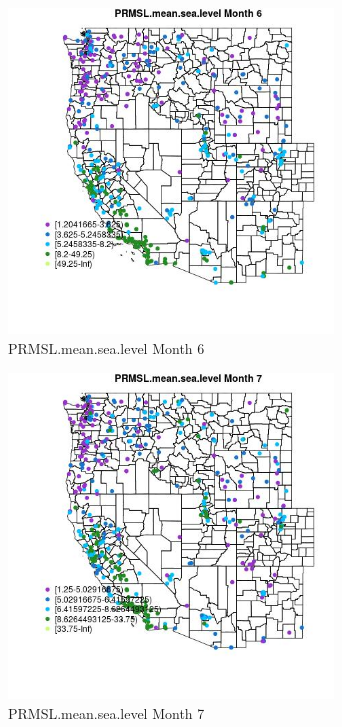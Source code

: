 \begin{figure} 
\centering  
\includegraphics[width=0.77\textwidth]{Code_Outputs/ML_input_report_ML_input_PM25_Step5_part_d_de_duplicated_aves_ML_input_MapObsMo6PRMSLmeansealevel.jpg} 
\caption{\label{fig:ML_input_report_ML_input_PM25_Step5_part_d_de_duplicated_aves_ML_inputMapObsMo6PRMSLmeansealevel}PRMSL.mean.sea.level Month 6} 
\end{figure} 
 

\begin{figure} 
\centering  
\includegraphics[width=0.77\textwidth]{Code_Outputs/ML_input_report_ML_input_PM25_Step5_part_d_de_duplicated_aves_ML_input_MapObsMo7PRMSLmeansealevel.jpg} 
\caption{\label{fig:ML_input_report_ML_input_PM25_Step5_part_d_de_duplicated_aves_ML_inputMapObsMo7PRMSLmeansealevel}PRMSL.mean.sea.level Month 7} 
\end{figure} 
 

